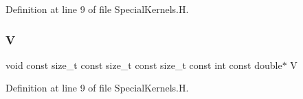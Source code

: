 Definition at line 9 of file Special\+Kernels.\+H.

\hypertarget{SpecialKernels_8H_ac6b3e75b07df9bb98a9911c89819ba5a}{}\label{SpecialKernels_8H_ac6b3e75b07df9bb98a9911c89819ba5a} 
\subsubsection{\texorpdfstring{V}{V}}
{\footnotesize\ttfamily void const size\+\_\+t const size\+\_\+t const size\+\_\+t const int const double$\ast$ V}



Definition at line 9 of file Special\+Kernels.\+H.

